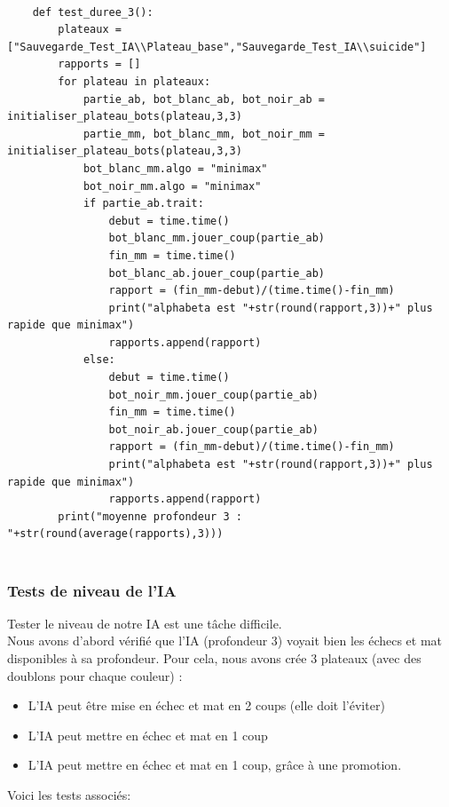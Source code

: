 \documentclass{article}
\begin{document}
\begin{verbatim}
       
    def test_duree_3():
        plateaux = ["Sauvegarde_Test_IA\\Plateau_base","Sauvegarde_Test_IA\\suicide"]
        rapports = []
        for plateau in plateaux:
            partie_ab, bot_blanc_ab, bot_noir_ab = initialiser_plateau_bots(plateau,3,3)
            partie_mm, bot_blanc_mm, bot_noir_mm = initialiser_plateau_bots(plateau,3,3)
            bot_blanc_mm.algo = "minimax"
            bot_noir_mm.algo = "minimax"
            if partie_ab.trait:
                debut = time.time()
                bot_blanc_mm.jouer_coup(partie_ab)
                fin_mm = time.time()
                bot_blanc_ab.jouer_coup(partie_ab)
                rapport = (fin_mm-debut)/(time.time()-fin_mm)
                print("alphabeta est "+str(round(rapport,3))+" plus rapide que minimax")
                rapports.append(rapport)
            else:
                debut = time.time()
                bot_noir_mm.jouer_coup(partie_ab)
                fin_mm = time.time()
                bot_noir_ab.jouer_coup(partie_ab)
                rapport = (fin_mm-debut)/(time.time()-fin_mm)
                print("alphabeta est "+str(round(rapport,3))+" plus rapide que minimax")
                rapports.append(rapport)
        print("moyenne profondeur 3 : "+str(round(average(rapports),3)))


\end{verbatim}


\subsubsection{Tests de niveau de l'IA}
Tester le niveau de notre IA est une tâche difficile.\\
Nous avons d'abord vérifié que l'IA (profondeur 3) voyait bien les échecs et mat disponibles à sa 
profondeur.
Pour cela, nous avons crée 3 plateaux (avec des doublons pour chaque couleur) :
\begin{itemize}
    \item L'IA peut être mise en échec et mat en 2 coups (elle doit l'éviter)
    \item L'IA peut mettre en échec et mat en 1 coup
    \item L'IA peut mettre en échec et mat en 1 coup, grâce à une promotion.
\end{itemize}

Voici les tests associés:
\end{document}

